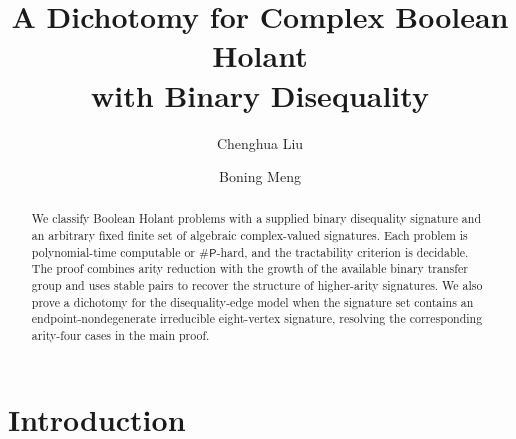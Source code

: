 \documentclass[11pt,letterpaper,onecolumn]{article}
\theoremstyle{plain}
\theoremstyle{definition}
\theoremstyle{remark}
\newcommand{\SharpP}{\#\mathsf P}
\begin{document}
\title{A Dichotomy for Complex Boolean Holant\\[0.15em]
with Binary Disequality}

\author[1]{Chenghua Liu}
\author[2]{Boning Meng}

\date{}

\hypersetup{pageanchor=false}
\begin{titlepage}
\maketitle
\thispagestyle{empty}

\begin{abstract}
\normalsize
We classify Boolean Holant problems with a supplied binary disequality signature and an arbitrary fixed finite set of algebraic complex-valued signatures. Each problem is polynomial-time computable or \(\SharpP\)-hard, and the tractability criterion is decidable. The proof combines arity reduction with the growth of the available binary transfer group and uses stable pairs to recover the structure of higher-arity signatures. We also prove a dichotomy for the disequality-edge model when the signature set contains an endpoint-nondegenerate irreducible eight-vertex signature, resolving the corresponding arity-four cases in the main proof.
\end{abstract}
\end{titlepage}


\clearpage
{}
\hypersetup{pageanchor=true}

\section{Introduction}
\label{s:sec:p1-introduction}
\end{document}
